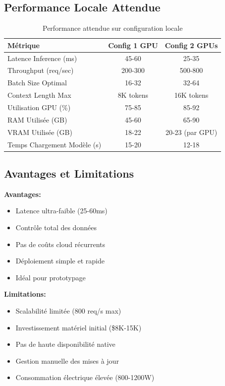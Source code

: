 \documentclass[12pt,a4paper]{article}
\begin{document}
\subsection{Performance Locale Attendue}

\begin{table}[H]
\centering
\begin{tabular}{|l|c|c|}
\hline
\textbf{Métrique} & \textbf{Config 1 GPU} & \textbf{Config 2 GPUs} \\
\hline
Latence Inference (ms) & 45-60 & 25-35 \\
\hline
Throughput (req/sec) & 200-300 & 500-800 \\
\hline
Batch Size Optimal & 16-32 & 32-64 \\
\hline
Context Length Max & 8K tokens & 16K tokens \\
\hline
Utilisation GPU (\%) & 75-85 & 85-92 \\
\hline
RAM Utilisée (GB) & 45-60 & 65-90 \\
\hline
VRAM Utilisée (GB) & 18-22 & 20-23 (par GPU) \\
\hline
Temps Chargement Modèle (s) & 15-20 & 12-18 \\
\hline
\end{tabular}
\caption{Performance attendue sur configuration locale}
\end{table}

\subsection{Avantages et Limitations}

\textbf{Avantages:}
\begin{itemize}
    \item Latence ultra-faible (25-60ms)
    \item Contrôle total des données
    \item Pas de coûts cloud récurrents
    \item Déploiement simple et rapide
    \item Idéal pour prototypage
\end{itemize}

\textbf{Limitations:}
\begin{itemize}
    \item Scalabilité limitée (800 req/s max)
    \item Investissement matériel initial (\$8K-15K)
    \item Pas de haute disponibilité native
    \item Gestion manuelle des mises à jour
    \item Consommation électrique élevée (800-1200W)
\end{itemize}
\end{document}
